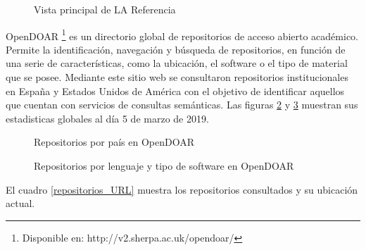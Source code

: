 \begin{figure}[!ht]
	\centering
    \caption{Vista principal de LA Referencia} %
    \label{la-referencia}
\end{figure}

OpenDOAR \footnote{Disponible en: http://v2.sherpa.ac.uk/opendoar/} es un directorio global de repositorios de acceso abierto académico. Permite la identificación, navegación y búsqueda de repositorios, en función de una serie de características, como la ubicación, el software o el tipo de material que se posee. Mediante este sitio web se consultaron repositorios institucionales en España y Estados Unidos de América con el objetivo de identificar aquellos que cuentan con servicios de consultas semánticas. Las figuras \ref{opendoar_estadisticas_1} y \ref{opendoar_estadisticas_2} muestran sus estadisticas globales al día 5 de marzo de 2019.\newline

\begin{figure}[!ht]
	\centering
    \caption{Repositorios por país en OpenDOAR} %
    \label{opendoar_estadisticas_1}
\end{figure}

\begin{figure}[!ht]
	\centering
    \caption{Repositorios por lenguaje y tipo de software en OpenDOAR} %
    \label{opendoar_estadisticas_2}
\end{figure}

El cuadro \ref{repositorios_URL} muestra los repositorios consultados y su ubicación actual.\newline


